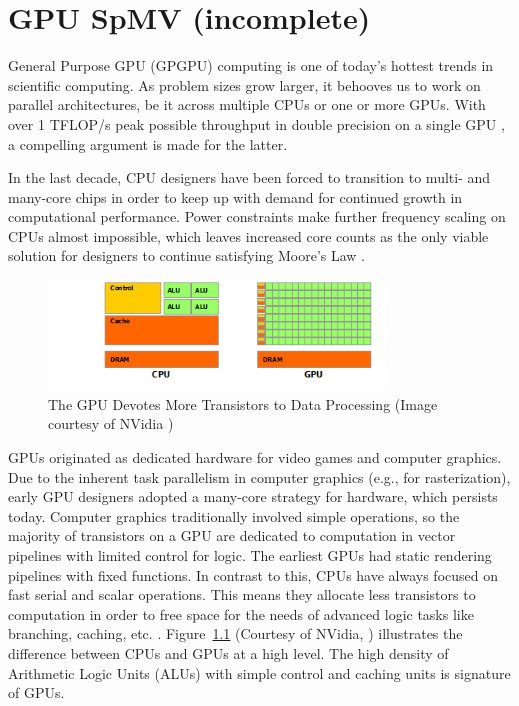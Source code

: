 \documentclass{report}
\begin{document}
\fi

\chapter{GPU SpMV (incomplete)}
\label{chap:gpu_rbffd}

General Purpose GPU (GPGPU) computing is one of today's hottest trends in scientific computing. As problem sizes grow larger, it behooves us to work on parallel architectures, be it across multiple CPUs or one or more GPUs. With over 1 TFLOP/s peak possible throughput in double precision on a single GPU \cite{KeplerFactSheet}, a compelling argument is made for the latter. 

In the last decade, CPU designers have been forced to transition to multi- and many-core chips in order to keep up with demand for continued growth in computational performance. 
Power constraints make further frequency scaling on CPUs almost impossible, which leaves increased core counts as the only viable solution for designers to continue satisfying Moore's Law \cite{Owens2007}. 

\begin{figure}
\centering
\includegraphics[width=0.8\textwidth]{gpu_content/nvidia_figures/gpu-devotes-more-transistors-to-data-processing.png}
\caption{The GPU Devotes More Transistors to Data Processing (Image courtesy of NVidia \cite{CudaGuide2013})} 
\label{fig:gpu-devotes-more-transistors-to-data-processing}
\end{figure}

GPUs originated as dedicated hardware for video games and computer graphics. 
Due to the inherent task parallelism in computer graphics  (e.g., for rasterization), early GPU designers adopted a many-core strategy for hardware, which persists today. Computer graphics traditionally involved simple operations, so the majority of transistors on a GPU are dedicated to computation in vector pipelines with limited control for logic. The earliest GPUs had static rendering pipelines with fixed functions. In contrast to this, CPUs have always focused on fast serial and scalar operations. This means they allocate less transistors to computation in order to free space for the needs of advanced logic tasks like branching, caching, etc. \cite{Owens2007,CudaGuide2013}. Figure~\ref{fig:gpu-devotes-more-transistors-to-data-processing} (Courtesy of NVidia, \cite{CudaGuide2013}) illustrates the difference between CPUs and GPUs at a high level. The high density of Arithmetic Logic Units (ALUs) with simple control and caching units is signature of GPUs. 
\end{document}
